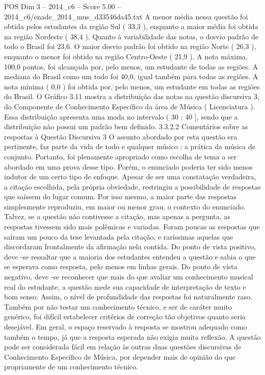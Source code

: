 \begin{textsample}{POS Dim 3 – 2014\_c6 – Score 5.00 – 2014\_c6/enade\_2014\_mus\_d33546da45.txt}
A menor média nessa questão foi obtida pelos estudantes da região Sul ( 33,3 ), enquanto a maior média foi obtida na região Nordeste ( 38,4 ).
Quanto à variabilidade das notas, o desvio padrão de todo o Brasil foi 23,6.
O maior desvio padrão foi obtido na região Norte ( 26,3 ), enquanto o menor foi obtido na região Centro-Oeste ( 21,9 ).
A nota máxima, 100,0 pontos, foi alcançada por, pelo menos, um estudante de todas as regiões.
A mediana do Brasil como um todo foi 40,0, igual também para todas as regiões.
A nota mínima ( 0,0 ) foi obtida por, pelo menos, um estudante em todas as regiões do Brasil.
O Gráfico 3.11 mostra a distribuição das notas na questão discursiva 3, do Componente de Conhecimento Específico da área de Música ( Licenciatura ).
Essa distribuição apresenta uma moda no intervalo ( 30 ; 40 ], sendo que a distribuição não possui um padrão bem definido. 3.3.2.2 Comentários sobre as respostas à Questão Discursiva 3 O assunto abordado por esta questão era pertinente, faz parte da vida de todo e qualquer músico : a prática da música de conjunto.
Portanto, foi plenamente apropriado como escolha de tema a ser abordado em uma prova desse tipo.
Porém, o enunciado poderia ter sido menos indutor de um certo tipo de enfoque.
Apesar de ser uma constatação verdadeira, a citação escolhida, pela própria obviedade, restringiu a possibilidade de respostas que saíssem do lugar comum.
Por isso mesmo, a maior parte das respostas simplesmente reproduziu, em maior ou menor grau, o contexto do enunciado.
Talvez, se a questão não contivesse a citação, mas apenas a pergunta, as respostas tivessem sido mais polêmicas e variadas.
Foram poucas as respostas que saíram um pouco da tese levantada pela citação, e raríssimas aquelas que discordaram frontalmente da afirmação nela contida.
Do ponto de vista positivo, deve -se ressaltar que a maioria dos estudantes entendeu a questão e sabia o que se esperava como resposta, pelo menos em linhas gerais.
Do ponto de vista negativo, deve -se reconhecer que mais do que avaliar um conhecimento musical real do estudante, a questão mede sua capacidade de interpretação de texto e bom senso.
Assim, o nível de profundidade das respostas foi naturalmente raso.
Também por não testar um conhecimento técnico, e ser de caráter muito genérico, foi difícil estabelecer critérios de correção tão objetivos quanto seria desejável.
Em geral, o espaço reservado à resposta se mostrou adequado como também o tempo, já que a resposta esperada não exigia muita reflexão.
A questão pode ser considerada fácil em relação às outras duas questões discursivas de Conhecimento Específico de Música, por depender mais de opinião do que propriamente de um conhecimento técnico.

\end{textsample}
